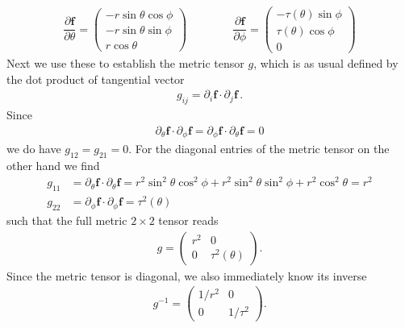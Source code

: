 \documentclass[11pt, DINA4, fleqn]{amsart}
\def\vf{\boldsymbol{f}\xspace}
\begin{document}
\begin{align}
\dfrac{\partial \vf}{\partial \theta} =
\begin{pmatrix}
-r\sin\theta\cos\phi \\
-r\sin\theta\sin\phi \\
r\cos\theta
\end{pmatrix}
\qquad \qquad
\dfrac{\partial \vf}{\partial \phi} =
\begin{pmatrix}
-\tau(\theta) \sin\phi\\
\tau(\theta) \cos\phi \\
0
\end{pmatrix}
\end{align}
Next we use these to establish the metric tensor $g$, which is as usual defined by the dot product of tangential vector
\begin{align}
g_{ij} = \partial_i \vf \cdot \partial_j\vf \, .
\end{align}
Since
\begin{align}
\partial_{\theta} \vf \cdot \partial_{\phi} \vf = \partial_{\phi}\vf \cdot \partial_{\theta}\vf = 0
\end{align}
we do have $g_{12} = g_{21} = 0$.
For the diagonal entries of the metric tensor on the other hand we find
\begin{align}
g_{11} &= \partial_{\theta}\vf \cdot \partial_{\theta}\vf= 
r^2\sin^2\theta\cos^2\phi + r^2\sin^2\theta\sin^2\phi + r^2\cos^2\theta = r^2 \\
g_{22} &= \partial_{\phi}\vf \cdot \partial_{\phi}\vf= \tau^2(\theta)
\end{align}
such that the full metric $2\times 2$ tensor reads
\begin{align}
g = \begin{pmatrix}
r^2 & 0 \\
0 & \tau^2(\theta)
\end{pmatrix}.
\end{align}
Since the metric tensor is diagonal, we also immediately know its inverse
\begin{align}
g^{-1} = \begin{pmatrix}
1/r^2 & 0 \\
0 & 1/\tau^2
\end{pmatrix}.
\end{align}
\end{document}
